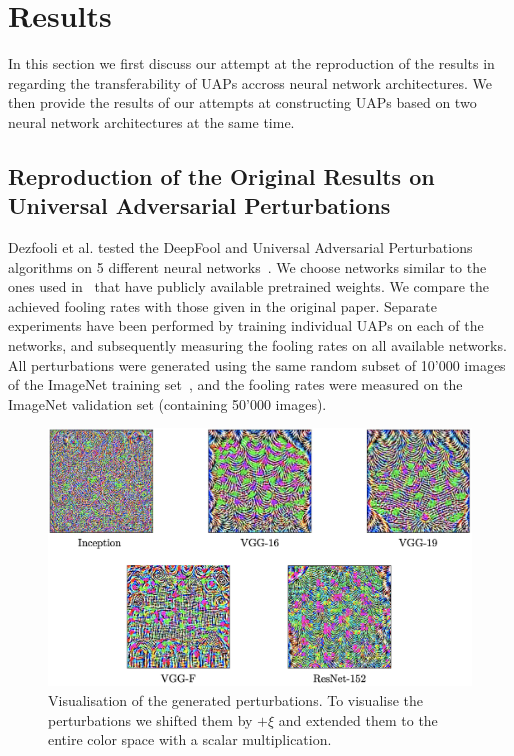 \documentclass[runningheads]{llncs}
\begin{document}
\section{Results}
In this section we first discuss our attempt at the reproduction of the results in~\cite{moosavidezfooli_universal_2017} regarding the transferability of UAPs accross neural network architectures. We then provide the results of our attempts at constructing UAPs based on two neural network architectures at the same time.

\subsection{Reproduction of the Original Results on Universal Adversarial Perturbations}
Dezfooli et al. tested the DeepFool and Universal Adversarial Perturbations algorithms on 5 different neural networks~\cite{moosavidezfooli_universal_2017}. We choose networks similar to the ones used in~\cite{moosavidezfooli_universal_2017} that have publicly available pretrained weights. We compare the achieved fooling rates with those given in the original paper. Separate experiments have been performed by training individual UAPs on each of the networks, and subsequently measuring the fooling rates on all available networks. All perturbations were generated using the same random subset of 10'000 images of the ImageNet training set~\cite{imagenet_cvpr09}, and the fooling rates were measured on the ImageNet validation set (containing 50'000 images).

\begin{figure}
	\centering
		\includegraphics[width=1.0\textwidth]{images/own_perturbations.png}
	\caption{Visualisation of the generated perturbations. To visualise the perturbations we shifted them by $+\xi$ and extended them to the entire color space with a scalar multiplication.}\label{fig_stoerwerte}
\end{figure}
\end{document}
